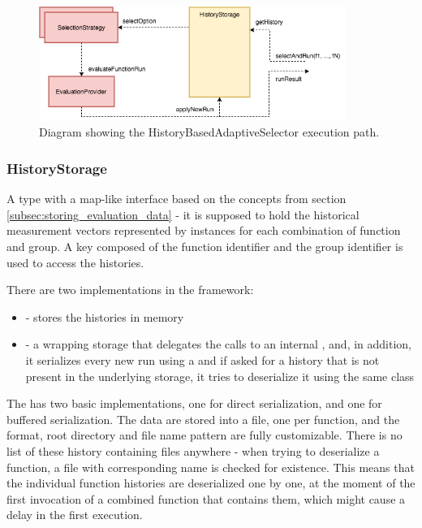 \begin{figure}[h!]
	\captionsetup{justification=centering,margin=0.5cm}
	\centerline{\mbox{\includegraphics[width=100mm]{./img/history_based_selector.png}}}
	\caption{Diagram showing the HistoryBasedAdaptiveSelector execution path.}
	\label{fig:history_based_selector}
\end{figure}

\subsubsection{HistoryStorage}

A type with a map-like interface based on the concepts from section \ref{subsec:storing_evaluation_data} - it is supposed to hold the historical measurement vectors represented by  instances for each combination of function and group. A key composed of the function identifier and the group identifier is used to access the histories.

There are two implementations in the framework:

\begin{itemize}
	\item{} - stores the histories in memory
	\item{} - a wrapping storage that delegates the calls to an internal , and, in addition, it serializes every new run using a  and if asked for a history that is not present in the underlying storage, it tries to deserialize it using the same class
\end{itemize}

The  has two basic implementations, one for direct serialization, and one for buffered serialization. The data are stored into a file, one per function, and the format, root directory and file name pattern are fully customizable. There is no list of these history containing files anywhere - when trying to deserialize a function, a file with corresponding name is checked for existence. This means that the individual function histories are deserialized one by one, at the moment of the first invocation of a combined function that contains them, which might cause a delay in the first execution.

